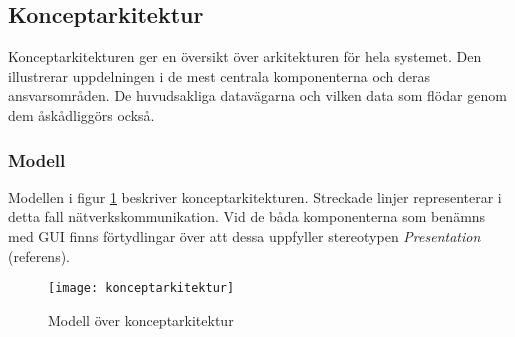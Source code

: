 \subsection{Konceptarkitektur}
Konceptarkitekturen ger en översikt över arkitekturen för hela systemet. Den illustrerar uppdelningen i de mest centrala komponenterna och deras ansvarsområden. De huvudsakliga datavägarna och vilken data som flödar genom dem åskådliggörs också.

\subsubsection{Modell}
Modellen i figur \ref{fig:konceptarkitektur} beskriver konceptarkitekturen. Streckade linjer representerar i detta fall nätverkskommunikation. Vid de båda komponenterna som benämns med GUI finns förtydlingar över att dessa uppfyller stereotypen \textit{Presentation} (referens).

\begin{figure}[h]
    \centering
    \texttt{[image: konceptarkitektur]}
    \caption{Modell över konceptarkitektur}
    \label{fig:konceptarkitektur}
\end{figure}

